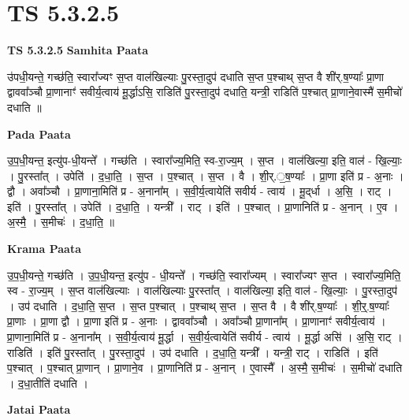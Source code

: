 \documentclass[17pt]{extarticle}
\begin{document}
\section{ TS 5.3.2.5 }

\textbf{TS 5.3.2.5 } \newline
\textbf{Samhita Paata} \newline

उ॑पधी॒यन्ते॒ गच्छ॑ति॒ स्वारा᳚ज्यꣳ स॒प्त वाल॑खिल्याः पु॒रस्ता॒दुप॑ दधाति स॒प्त प॒श्चाथ् स॒प्त वै शी॑र्.ष॒ण्याः᳚ प्रा॒णा द्वाववा᳚ञ्चौ प्रा॒णानाꣳ॑ सवीर्य॒त्वाय॑ मू॒र्द्धाऽसि॒ राडिति॑ पु॒रस्ता॒दुप॑ दधाति॒ यन्त्री॒ राडिति॑ प॒श्चात् प्रा॒णाने॒वास्मै॑ स॒मीचो॑ दधाति ॥ \newline

\textbf{Pada Paata} \newline

उ॒प॒धी॒यन्त॒ इत्यु॑प-धी॒यन्ते᳚ । गच्छ॑ति । स्वारा᳚ज्य॒मिति॒ स्व-रा॒ज्य॒म् । स॒प्त । वाल॑खिल्या॒ इति॒ वाल॑ - खि॒ल्याः॒ । पु॒रस्ता᳚त् । उपेति॑ । द॒धा॒ति॒ । स॒प्त । प॒श्चात् । स॒प्त । वै । शी॒र्.॒ष॒ण्याः᳚ । प्रा॒णा इति॑ प्र - अ॒नाः । द्वौ । अवा᳚ञ्चौ । प्रा॒णाना॒मिति॑ प्र - अ॒नाना᳚म् । स॒वी॒र्य॒त्वायेति॑ सवीर्य - त्वाय॑ । मू॒द्‌र्धा । अ॒सि॒ । राट् । इति॑ । पु॒रस्ता᳚त् । उपेति॑ । द॒धा॒ति॒ । यन्त्री᳚ । राट् । इति॑ । प॒श्चात् । प्रा॒णानिति॑ प्र - अ॒नान् । ए॒व । अ॒स्मै॒ । स॒मीचः॑ । द॒धा॒ति॒ ॥  \newline


\textbf{Krama Paata} \newline

उ॒प॒धी॒यन्ते॒ गच्छ॑ति । उ॒प॒धी॒यन्त॒ इत्यु॑प - धी॒यन्ते᳚ । गच्छ॑ति॒ स्वारा᳚ज्यम् । स्वारा᳚ज्यꣳ स॒प्त । स्वारा᳚ज्य॒मिति॒ स्व - रा॒ज्य॒म् । स॒प्त वाल॑खिल्याः । वाल॑खिल्याः पु॒रस्ता᳚त् । वाल॑खिल्या॒ इति॒ वाल॑ - खि॒ल्याः॒ । पु॒रस्ता॒दुप॑ । उप॑ दधाति । द॒धा॒ति॒ स॒प्त । स॒प्त प॒श्चात् । प॒श्चाथ् स॒प्त । स॒प्त वै । वै शी॑र्.ष॒ण्याः᳚ । शी॒र्॒.ष॒ण्याः᳚ प्रा॒णाः । प्रा॒णा द्वौ । प्रा॒णा इति॑ प्र - अ॒नाः । द्वाववा᳚ञ्चौ । अवा᳚ञ्चौ प्रा॒णाना᳚म् । प्रा॒णानाꣳ॑ सवीर्य॒त्वाय॑ । प्रा॒णाना॒मिति॑ प्र - अ॒नाना᳚म् । स॒वी॒र्य॒त्वाय॑ मू॒र्द्धा । स॒वी॒र्य॒त्वायेति॑ सवीर्य - त्वाय॑ । मू॒र्द्धा असि॑ । अ॒सि॒ राट् । राडिति॑ । इति॑ पु॒रस्ता᳚त् । पु॒रस्ता॒दुप॑ । उप॑ दधाति । द॒धा॒ति॒ यन्त्री᳚ । यन्त्री॒ राट् । राडिति॑ । इति॑ प॒श्चात् । प॒श्चात् प्रा॒णान् । प्रा॒णाने॒व । प्रा॒णानिति॑ प्र - अ॒नान् । ए॒वास्मै᳚ । अ॒स्मै॒ स॒मीचः॑ । स॒मीचो॑ दधाति । द॒धा॒तीति॑ दधाति । \newline

\textbf{Jatai Paata} \newline
\end{document}
